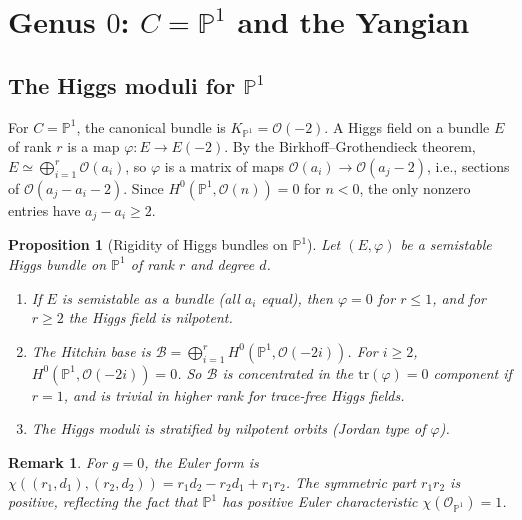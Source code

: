 \documentclass[11pt]{article}
\theoremstyle{garamondthm}
\newtheorem{proposition}[theorem]{Proposition}
\theoremstyle{garamonddef}
\theoremstyle{garamondrem}
\newtheorem{remark}[theorem]{Remark}
\newcommand{\cB}{\mathcal{B}}
\newcommand{\cO}{\mathcal{O}}
\begin{document}

\section{Genus $0$: $C = \mathbb{P}^1$ and the Yangian}
\label{sec:genus-0}

\subsection{The Higgs moduli for $\mathbb{P}^1$}
\label{ssec:higgs-p1}

For $C = \mathbb{P}^1$, the canonical bundle is $K_{\mathbb{P}^1} = \cO(-2)$. A Higgs field on a bundle $E$ of rank $r$ is a map $\varphi \colon E \to E(-2)$. By the Birkhoff--Grothendieck theorem, $E \simeq \bigoplus_{i=1}^r \cO(a_i)$, so $\varphi$ is a matrix of maps $\cO(a_i) \to \cO(a_j - 2)$, i.e., sections of $\cO(a_j - a_i - 2)$. Since $H^0(\mathbb{P}^1, \cO(n)) = 0$ for $n < 0$, the only nonzero entries have $a_j - a_i \geq 2$.

\begin{proposition}[Rigidity of Higgs bundles on $\mathbb{P}^1$]
\label{prop:higgs-p1-rigid}
Let $(E, \varphi)$ be a semistable Higgs bundle on $\mathbb{P}^1$ of rank $r$ and degree $d$.
\begin{enumerate}[label=(\roman*)]
 \item If $E$ is semistable as a bundle (all $a_i$ equal), then $\varphi = 0$ for $r \leq 1$, and for $r \geq 2$ the Higgs field is nilpotent.
 \item The Hitchin base is $\cB = \bigoplus_{i=1}^r H^0(\mathbb{P}^1, \cO(-2i))$. For $i \geq 2$, $H^0(\mathbb{P}^1, \cO(-2i)) = 0$. So $\cB$ is concentrated in the $\mathrm{tr}(\varphi) = 0$ component if $r = 1$, and is trivial in higher rank for trace-free Higgs fields.
 \item The Higgs moduli is stratified by nilpotent orbits (Jordan type of $\varphi$).
\end{enumerate}
\end{proposition}

\begin{remark}
\label{rem:p1-euler-form}
For $g = 0$, the Euler form is $\chi((r_1,d_1),(r_2,d_2)) = r_1 d_2 - r_2 d_1 + r_1 r_2$. The symmetric part $r_1 r_2$ is positive, reflecting the fact that $\mathbb{P}^1$ has positive Euler characteristic $\chi(\cO_{\mathbb{P}^1}) = 1$.
\end{remark}
\end{document}
